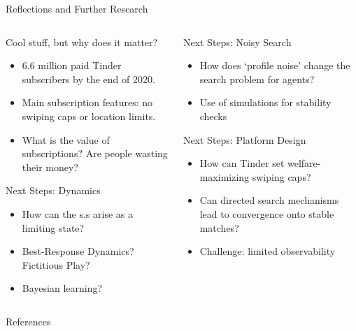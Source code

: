 \documentclass[10pt, aspectratio=169,xcolor=dvipsnames]{beamer}
\makeatletter
\newenvironment{myitemize}{%
   \setlength{\topsep}{0pt}
   \setlength{\partopsep}{0pt}
   \itemize
}{\enditemize}
\makeatother
\begin{document}
\begin{frame}{Reflections and Further Research}
\begin{columns}
\begin{column}{0.5\textwidth}
\begin{myitemize}
\setlength\itemsep{1em}  
    \item Cool stuff, but why does it matter?
    \begin{itemize}
    \setlength\itemsep{0.5em}
        \item 6.6 million paid Tinder subscribers by the end of 2020.
        \item Main subscription features: no swiping caps or location limits.
        \item What is the value of subscriptions? Are people wasting their money?  
    \end{itemize}
    
    \item Next Steps: Dynamics
    \begin{itemize}
    \setlength\itemsep{0.5em}
        \item How can the s.s arise as a limiting state?
        \item Best-Response Dynamics? Fictitious Play? 
        \item Bayesian learning?
    \end{itemize}
\end{myitemize}
\end{column} 

\begin{column}{0.5\textwidth}
\begin{myitemize}
\setlength\itemsep{1em}
    \item Next Steps: Noisy Search
    \begin{itemize}
    \setlength\itemsep{0.5em}
        \item How does `profile noise' change the search problem for agents? 
        \item Use of simulations for stability checks
    \end{itemize}
    
    \item Next Steps: Platform Design
    \begin{itemize}
        \setlength\itemsep{0.5em}
        \item How can Tinder set welfare-maximizing swiping caps?
        \item Can directed search mechanisms lead to convergence onto stable matches?
        \item Challenge: limited observability
    \end{itemize}
\end{myitemize}
\end{column}
\end{columns}   
\end{frame}

\begin{frame}[allowframebreaks]{References}


\end{frame}
\end{document}
